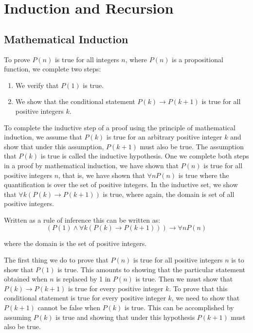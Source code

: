 \documentclass[../discrete.tex]{subfiles}
\begin{document}
\chapter{Induction and Recursion}
\section{Mathematical Induction}
To prove $P(n)$ is true for all integers $n$, where $P(n)$ is a propositional function,
we complete two steps:
\begin{enumerate}
    \item We verify that $P(1)$ is true.
    \item We show that the conditional statement $P(k)\rightarrow P(k+1)$ is true for all positive integers $k$.
\end{enumerate}

To complete the inductive step of a proof using the principle of mathematical induction, 
we assume that $P(k)$ is true for an arbitrary positive integer $k$ and show that under 
this assumption, $P(k+1)$ must also be true. The assumption that $P(k)$ is true is 
called the inductive hypothesis. One we complete both steps in a proof by 
mathematical induction, we have shown that $P(n)$ is true for all positive integers $n$, that is,
we have shown that $\forall nP(n)$ is true where the quantification is over the set of 
positive integers. In the inductive set, we show that $\forall k(P(k)\rightarrow P(k+1))$ is true, where 
again, the domain is set of all positive integers.

Written as a rule of inference this can be written as:
\[(P(1)\land \forall k (P(k)\rightarrow P(k+1)))\rightarrow \forall nP(n)\]

where the domain is the set of positive integers.

The first thing we do to prove that $P(n)$ is true for all positive integers $n$ is to show that 
$P(1)$ is true. This amounts to showing that the particular statement obtained when 
$n$ is replaced by 1 in $P(n)$ is true. Then we must show that $P(k)\rightarrow P(k+1)$ is true for 
every positive integer $k$. To prove that this conditional statement is true for every positive 
integer $k$, we need to show that $P(k+1)$ cannot be false when $P(k)$ is true. This can be accomplished by 
assuming $P(k)$ is true and showing that under this hypothesis $P(k+1)$ must also be true.
\end{document}
